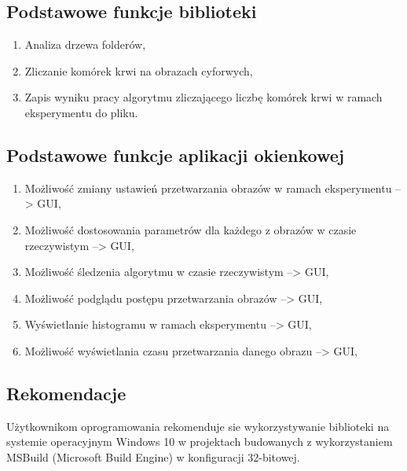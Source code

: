 \documentclass{article}
\begin{document}
        \newpage
        \subsection{Podstawowe funkcje biblioteki}
        {
            \Large
            \quad
            \begin{enumerate}
                \item Analiza drzewa folderów,
                \item Zliczanie komórek krwi na obrazach cyforwych,
                \item Zapis wyniku pracy algorytmu zliczającego liczbę komórek krwi w ramach eksperymentu do pliku.
            \end{enumerate}
        }

        \subsection{Podstawowe funkcje aplikacji okienkowej}
        {
            \Large
            \quad
            \begin{enumerate}
                \item Możliwość zmiany ustawień przetwarzania obrazów w ramach eksperymentu --> GUI,
                \item Możliwość dostosowania parametrów dla każdego z obrazów w czasie rzeczywistym --> GUI,
                \item Możliwość śledzenia algorytmu w czasie rzeczywistym --> GUI,
                \item Możliwość podglądu postępu przetwarzania obrazów --> GUI,
                \item Wyświetlanie histogramu w ramach eksperymentu --> GUI,
                \item Możliwość wyświetlania czasu przetwarzania danego obrazu --> GUI,
            \end{enumerate}
        }

        \subsection{Rekomendacje}
        {
            \Large
            \justifying
            \quad
            Użytkownikom oprogramowania rekomenduje sie wykorzystywanie biblioteki na systemie operacyjnym Windows 10 w projektach budowanych z wykorzystaniem MSBuild (Microsoft Build Engine) w konfiguracji 32-bitowej. \cite{msdocsmsbuild}
        }
\end{document}
